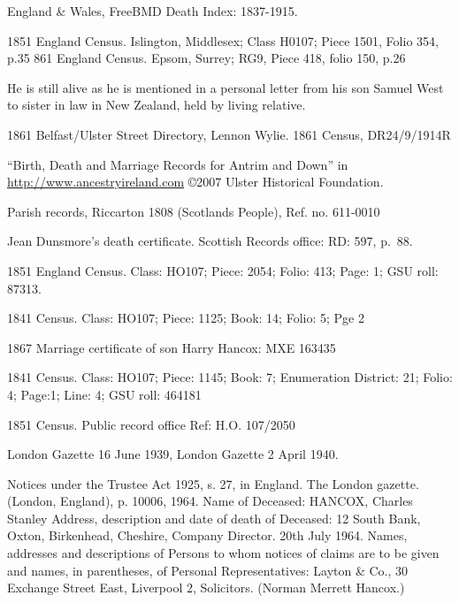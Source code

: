 \begin{thebibliography}{99}
	England \& Wales, FreeBMD Death Index: 1837-1915.

	1851 England Census.
	Islington, Middlesex; Class H0107; Piece 1501, Folio 354, p.35
	861 England Census.
	Epsom, Surrey; RG9, Piece 418, folio 150, p.26

	He is still alive as he is mentioned in a personal letter from his son Samuel West to sister in law
	in New Zealand, held by living relative.

	1861 Belfast/Ulster Street Directory, Lennon Wylie.
	1861 Census, DR24/9/1914R

	``Birth, Death and Marriage Records for Antrim and Down'' in
	\url{http://www.ancestryireland.com} \copyright 2007 Ulster Historical Foundation.

	Parish records, Riccarton 1808 (Scotlands People), Ref. no. 611-0010

	Jean Dunsmore's death certificate. Scottish Records office: RD: 597, p.~88.

	1851 England Census.
	Class: HO107; Piece: 2054; Folio: 413; Page: 1; GSU roll: 87313.

	1841 Census.
	Class: HO107; Piece: 1125; Book: 14; Folio: 5; Pge 2

	1867 Marriage certificate of son Harry Hancox: MXE 163435

	1841 Census.
	Class: HO107; Piece: 1145; Book: 7; Enumeration District: 21; Folio: 4; Page:1; Line: 4; GSU roll: 464181

	1851 Census.
	Public record office Ref: H.O. 107/2050

	London Gazette 16 June 1939, London Gazette 2 April 1940.

	Notices under the Trustee Act 1925, s. 27, in England. The London gazette. (London, England), p. 10006, 1964.
	Name of Deceased: HANCOX, Charles Stanley
	Address, description and date of death of Deceased:
	12 South Bank, Oxton, Birkenhead, Cheshire, Company Director. 20th July 1964.
	Names, addresses and descriptions of Persons to whom notices of claims are to be given and names, in parentheses, of Personal Representatives:
	Layton \& Co., 30 Exchange Street East, Liverpool 2, Solicitors. (Norman Merrett Hancox.)


\end{thebibliography}
